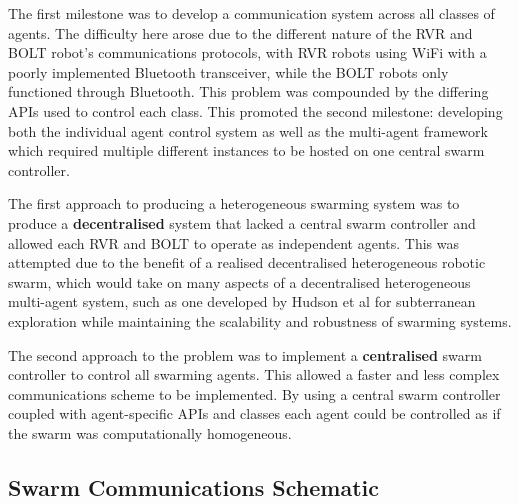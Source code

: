 \documentclass[conference]{IEEEtran}
\begin{document}
The first milestone was to develop a communication system across all classes of agents. The difficulty here arose due to the different nature of the RVR and BOLT robot's communications protocols, with RVR robots using WiFi with a poorly implemented Bluetooth transceiver, while the BOLT robots only functioned through Bluetooth. This problem was compounded by the differing APIs used to control each class. This promoted the second milestone: developing both the individual agent control system as well as the multi-agent framework which required multiple different instances to be hosted on one central swarm controller. 

The first approach to producing a heterogeneous swarming system was to produce a \textbf{decentralised} system that lacked a central swarm controller and allowed each RVR and BOLT to operate as independent agents. This was attempted due to the benefit of a realised decentralised heterogeneous robotic swarm, which would take on many aspects of a decentralised heterogeneous multi-agent system, such as one developed by Hudson et al for subterranean exploration \cite{hudson_heterogeneous_2022} while maintaining the scalability and robustness of swarming systems.

The second approach to the problem was to implement a \textbf{centralised} swarm controller to control all swarming agents. This allowed a faster and less complex communications scheme to be implemented. By using a central swarm controller coupled with agent-specific APIs and classes each agent could be controlled as if the swarm was computationally homogeneous.

\subsection{Swarm Communications Schematic} 
\end{document}
